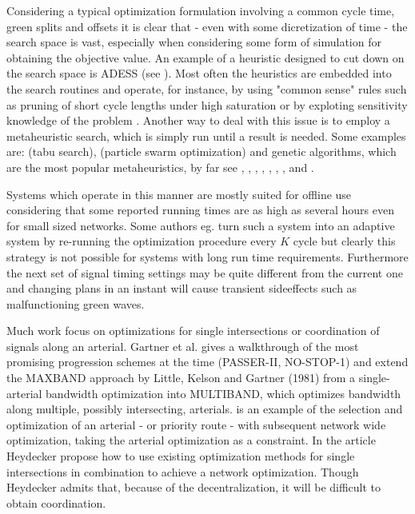 Considering a typical optimization formulation involving a common cycle time, green splits and offsets it is clear that - even with some dicretization of time - the search space is vast, especially when considering some form of simulation for obtaining the objective value. An example of a heuristic designed to cut down on the search space is ADESS (see \cite{26}). Most often the heuristics are embedded into the search routines and operate, for instance, by using "common sense" rules such as pruning of short cycle lengths under high saturation or by exploting sensitivity knowledge of the problem \cite{40}.
Another way to deal with this issue is to employ a metaheuristic search, which is simply run until a result is needed. Some examples are: \cite{1} (tabu search), \cite{42} (particle swarm optimization) and genetic algorithms, which are the most popular metaheuristics, by far see \cite{13}, \cite{33}, \cite{43}, \cite{7}, \cite{41}, \cite{31}, \cite{27}, \cite{2} and \cite{26}.

Systems which operate in this manner are mostly suited for offline use considering that some reported running times are as high as several hours even for small sized networks.
Some authors eg. \cite{16} turn such a system into an adaptive system by re-running the optimization procedure every $K$ cycle but clearly this strategy is not possible for systems with long run time requirements. Furthermore the next set of signal timing settings may be quite different from the current one and changing plans in an instant will cause transient sideeffects such as malfunctioning green waves.

Much work focus on optimizations for single intersections or coordination of signals along an arterial. Gartner et al. \cite{9} gives a walkthrough of the most promising progression schemes at the time (PASSER-II, NO-STOP-1) and extend the MAXBAND approach by Little, Kelson and Gartner (1981) from a single-arterial bandwidth optimization into MULTIBAND, which optimizes bandwidth along multiple, possibly intersecting, arterials. \cite{6} is an example of the selection and optimization of an arterial - or priority route - with subsequent network wide optimization, taking the arterial optimization as a constraint.
In the article \cite{24} Heydecker propose how to use existing optimization methods for single intersections in combination to achieve a network optimization. Though Heydecker admits that, because of the decentralization, it will be difficult to obtain coordination.
